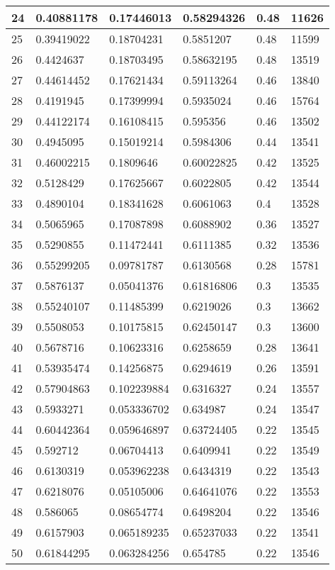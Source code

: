 \begin{longtable}{|l|l|l|l|l|l|}
24 & 0.40881178 & 0.17446013 & 0.58294326 & 0.48 & 11626 \\ \hline 
25 & 0.39419022 & 0.18704231 & 0.5851207 & 0.48 & 11599 \\ \hline 
26 & 0.4424637 & 0.18703495 & 0.58632195 & 0.48 & 13519 \\ \hline 
27 & 0.44614452 & 0.17621434 & 0.59113264 & 0.46 & 13840 \\ \hline 
28 & 0.4191945 & 0.17399994 & 0.5935024 & 0.46 & 15764 \\ \hline 
29 & 0.44122174 & 0.16108415 & 0.595356 & 0.46 & 13502 \\ \hline 
30 & 0.4945095 & 0.15019214 & 0.5984306 & 0.44 & 13541 \\ \hline 
31 & 0.46002215 & 0.1809646 & 0.60022825 & 0.42 & 13525 \\ \hline 
32 & 0.5128429 & 0.17625667 & 0.6022805 & 0.42 & 13544 \\ \hline 
33 & 0.4890104 & 0.18341628 & 0.6061063 & 0.4 & 13528 \\ \hline 
34 & 0.5065965 & 0.17087898 & 0.6088902 & 0.36 & 13527 \\ \hline 
35 & 0.5290855 & 0.11472441 & 0.6111385 & 0.32 & 13536 \\ \hline 
36 & 0.55299205 & 0.09781787 & 0.6130568 & 0.28 & 15781 \\ \hline 
37 & 0.5876137 & 0.05041376 & 0.61816806 & 0.3 & 13535 \\ \hline 
38 & 0.55240107 & 0.11485399 & 0.6219026 & 0.3 & 13662 \\ \hline 
39 & 0.5508053 & 0.10175815 & 0.62450147 & 0.3 & 13600 \\ \hline 
40 & 0.5678716 & 0.10623316 & 0.6258659 & 0.28 & 13641 \\ \hline 
41 & 0.53935474 & 0.14256875 & 0.6294619 & 0.26 & 13591 \\ \hline 
42 & 0.57904863 & 0.102239884 & 0.6316327 & 0.24 & 13557 \\ \hline 
43 & 0.5933271 & 0.053336702 & 0.634987 & 0.24 & 13547 \\ \hline 
44 & 0.60442364 & 0.059646897 & 0.63724405 & 0.22 & 13545 \\ \hline 
45 & 0.592712 & 0.06704413 & 0.6409941 & 0.22 & 13549 \\ \hline 
46 & 0.6130319 & 0.053962238 & 0.6434319 & 0.22 & 13543 \\ \hline 
47 & 0.6218076 & 0.05105006 & 0.64641076 & 0.22 & 13553 \\ \hline 
48 & 0.586065 & 0.08654774 & 0.6498204 & 0.22 & 13546 \\ \hline 
49 & 0.6157903 & 0.065189235 & 0.65237033 & 0.22 & 13541 \\ \hline 
50 & 0.61844295 & 0.063284256 & 0.654785 & 0.22 & 13546 \\ \hline 
\end{longtable}